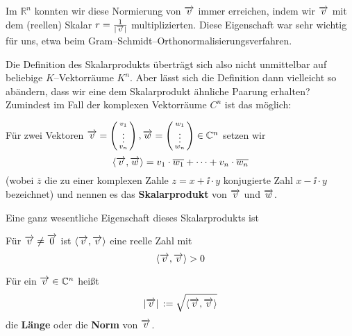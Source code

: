 Im $\mathbb R^n$ konnten wir diese Normierung von $\overrightarrow{v}$ immer erreichen, 
indem wir $\overrightarrow{v}$ mit dem (reellen) Skalar
$r = \frac {1}{\vert \overrightarrow{v} \vert }$ 
multiplizierten. Diese Eigenschaft war sehr wichtig für uns, etwa beim 
Gram--Schmidt--Orthonormalisierungsver\-fah\-ren.

Die Definition des Skalarprodukts überträgt sich also nicht unmittelbar auf 
beliebige $K$--Vektorräume $K^n$. Aber lässt sich die Definition dann vielleicht 
so abändern, dass wir eine  dem Skalarprodukt ähnliche Paarung erhalten? Zumindest 
im Fall der komplexen Vektorräume $C^n$ ist das möglich:

\begin{definition} Für zwei Vektoren $\overrightarrow{v} = \left( \begin{smallmatrix} 
v_1 \\ \vdots \\ v_n \end{smallmatrix} \right), \overrightarrow{w} = \left( 
\begin{smallmatrix} w_1 \\ \vdots \\ w_n \end{smallmatrix} \right) \in \mathbb C^n$ 
setzen  wir
  	$$ \langle \overrightarrow{v}, \overrightarrow{w} \rangle = v_1 \cdot \overline{w_1} + 
  	\cdots + v_n \cdot \overline{w_n} $$
(wobei $\overline{z}$ die zu einer komplexen Zahle $z = x + \ii \cdot  y$ konjugierte Zahl 
$x - \ii \cdot y$ bezeichnet)
und nennen es das \textbf{Skalarprodukt} von $\overrightarrow{v}$ 
und $\overrightarrow{w}$.
\end{definition}
 
Eine ganz wesentliche Eigenschaft dieses Skalarprodukts ist
 
\begin{satz}\label{vect_complex_norm} Für $\overrightarrow{v} \neq \overrightarrow{0}$ ist 
$\langle \overrightarrow{v}, \overrightarrow{v} \rangle$ eine reelle Zahl mit
  	$$ \langle \overrightarrow{v}, \overrightarrow{v} \rangle > 0 $$
\end{satz}

\bigbreak

\begin{definition} Für ein $\overrightarrow{v} \in \mathbb C^n$ heißt 
  	$$ \vert \overrightarrow{v} \vert \, := \sqrt{\langle \overrightarrow{v}, 
	\overrightarrow{v} \rangle} $$ 
die \textbf{Länge} oder die \textbf{Norm} von $\overrightarrow{v}$.
\end{definition}

